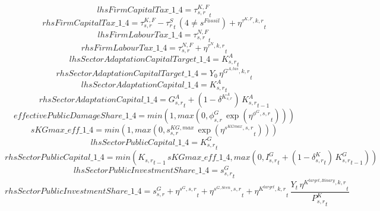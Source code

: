 \begin{dmath*}
lhsFirmCapitalTax\_1\_4 = {{\tau^{K,F}_{s,r}}}_{t}
\end{dmath*}
\begin{dmath*}
rhsFirmCapitalTax\_1\_4 = {{\tau^{K,F}_{s,r}}}-{{\tau^{S}_{r}}}_{t}\, \left(4\neq {{s^{Fossil}}}\right)+{{\eta^{\tau^{K,F},k,r}}}_{t}
\end{dmath*}
\begin{dmath*}
lhsFirmLabourTax\_1\_4 = {{\tau^{N,F}_{s,r}}}_{t}
\end{dmath*}
\begin{dmath*}
rhsFirmLabourTax\_1\_4 = {{\tau^{N,F}_{s,r}}}+{{\eta^{\tau^{N},k,r}}}_{t}
\end{dmath*}
\begin{dmath*}
lhsSectorAdaptationCapitalTarget\_1\_4 = {{K^{A}_{s,r}}}_{t}
\end{dmath*}
\begin{dmath*}
rhsSectorAdaptationCapitalTarget\_1\_4 = {{Y_0}}\, {{\eta^{G^{A,tas},k,r}}}_{t}
\end{dmath*}
\begin{dmath*}
lhsSectorAdaptationCapital\_1\_4 = {{K^{A}_{s,r}}}_{t}
\end{dmath*}
\begin{dmath*}
rhsSectorAdaptationCapital\_1\_4 = {{G^{A}_{s,r}}}_{t}+\left(1-{{\delta^{K^{A}_{s,r}}}}\right)\, {{K^{A}_{s,r}}}_{t-1}
\end{dmath*}
\begin{dmath*}
effectivePublicDamageShare\_1\_4 = min(1,max(0,{{\phi^{G}_{s,r}}}\, \exp\left({{\eta^{\phi^{G},s,r}}}_{t}\right)))
\end{dmath*}
\begin{dmath*}
sKGmax\_eff\_1\_4 = min(1,max(0,{{s^{KG,max}_{s,r}}}\, \exp\left({{\eta^{s^{KGmax},s,r}}}_{t}\right)))
\end{dmath*}
\begin{dmath*}
lhsSectorPublicCapital\_1\_4 = {{K^G_{s,r}}}_{t}
\end{dmath*}
\begin{dmath*}
rhsSectorPublicCapital\_1\_4 = min({{K_{s,r}}}_{t-1}\, {sKGmax\_eff\_1\_4},max(0,{{I^G_{s,r}}}_{t}+\left(1-{{\delta^{K}_{s,r}}}_{t}\right)\, {{K^G_{s,r}}}_{t-1}))
\end{dmath*}
\begin{dmath*}
lhsSectorPublicInvestmentShare\_1\_4 = {{s^G_{s,r}}}_{t}
\end{dmath*}
\begin{dmath*}
rhsSectorPublicInvestmentShare\_1\_4 = {{s^{G}_{s,r}}}+{{\eta^{s^G,s,r}}}_{t}+{{\eta^{s^{G,Scen},s,r}}}_{t}+{{\eta^{K^{target},k,r}}}_{t}\, \frac{{Y}_{t}\, {{\eta^{K^{target,Binary},k,r}}}_{t}}{{{P^K_{s,r}}}_{t}}
\end{dmath*}
